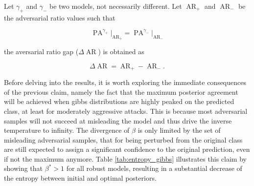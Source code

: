 \begin{definition}
    Let $\gamma_+$ and $\gamma_-$ be two models, not necessarily different. Let $\operatorname{AR}_{+}$ and 
    $\operatorname{AR}_{-}$ be the adversarial ratio values such that

    $$
    \operatorname{PA}^{\gamma_+} \bigg|_{\operatorname{AR}_{+}} = \operatorname{PA}^{\gamma_-}\bigg|_{\operatorname{AR}_{-}}
    $$

    the aversarial ratio gap ($\Delta \operatorname{AR}$) is obtained as

    $$
    \Delta\operatorname{AR} = \operatorname{AR}_{+} - \operatorname{AR}_{-}. 
    $$
\end{definition}

Before delving into the results, it is worth exploring the immediate consequences
of the previous claim, namely the fact that the maximum posterior agreement will
be achieved when gibbs distributions are highly peaked on the predicted 
class, at least for moderately aggressive attacks. This is because most adversarial 
samples will not succeed at misleading the model and thus drive the inverse temperature to
infinity. The divergence of $\beta$ is only limited by the set of misleading adversarial 
samples, that for being perturbed from the original class are still expected to assign a
significant confidence to the original prediction, even if not the maximum anymore.
Table \ref{tab:entropy_gibbs} illustrates this claim by showing that $\beta^{*} > 1$ 
for all robust models, resulting in a substantial decrease of the entropy between initial and 
optimal posteriors. \\

